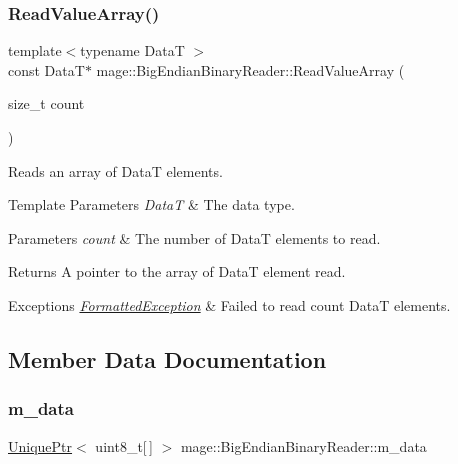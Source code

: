 \subsubsection{\texorpdfstring{Read\+Value\+Array()}{ReadValueArray()}}
{\footnotesize\ttfamily template$<$typename DataT $>$ \\
const DataT$\ast$ mage\+::\+Big\+Endian\+Binary\+Reader\+::\+Read\+Value\+Array (\begin{DoxyParamCaption}\item[{size\+\_\+t}]{count }\end{DoxyParamCaption})\hspace{0.3cm}{\ttfamily [protected]}}

Reads an array of {\ttfamily DataT} elements.


\begin{DoxyTemplParams}{Template Parameters}
{\em DataT} & The data type. \\
\hline
\end{DoxyTemplParams}

\begin{DoxyParams}{Parameters}
{\em count} & The number of {\ttfamily DataT} elements to read. \\
\hline
\end{DoxyParams}
\begin{DoxyReturn}{Returns}
A pointer to the array of {\ttfamily DataT} element read. 
\end{DoxyReturn}

\begin{DoxyExceptions}{Exceptions}
{\em \hyperlink{structmage_1_1_formatted_exception}{Formatted\+Exception}} & Failed to read {\ttfamily count} {\ttfamily DataT} elements. \\
\hline
\end{DoxyExceptions}


\subsection{Member Data Documentation}
\hypertarget{classmage_1_1_big_endian_binary_reader_a22cf45ba63fdf09755041a9864b6b266}{}\label{classmage_1_1_big_endian_binary_reader_a22cf45ba63fdf09755041a9864b6b266} 
\subsubsection{\texorpdfstring{m\+\_\+data}{m\_data}}
{\footnotesize\ttfamily \hyperlink{namespacemage_a8c307fbcc33bce9b7f2aa4c26c3b95cf}{Unique\+Ptr}$<$ uint8\+\_\+t\mbox{[}$\,$\mbox{]} $>$ mage\+::\+Big\+Endian\+Binary\+Reader\+::m\+\_\+data\hspace{0.3cm}{\ttfamily [private]}}

